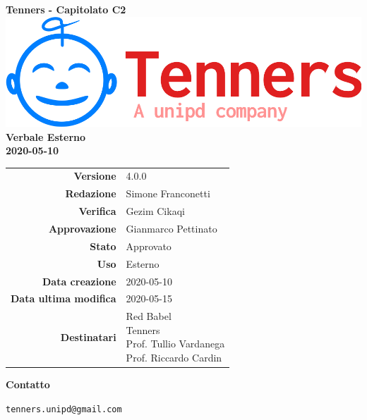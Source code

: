 \begin{titlepage}
	\begin{center}
		\large \textbf{Tenners - Capitolato C2}
		\vfill
		\includegraphics[scale = 0.3]{./res/img/logo.png}\\
		\vfill
		\Huge \textbf{Verbale Esterno} \\
		\textbf {2020-05-10}

        \vfill
        \large

        \begin{tabular}{r|l}
        	\textbf{Versione} & 4.0.0 \\
        	\textbf{Redazione} & Simone Franconetti \\
        	\textbf{Verifica} &  Gezim Cikaqi \\
        	\textbf{Approvazione} & Gianmarco Pettinato \\
        	\textbf{Stato} & Approvato \\
        	\textbf{Uso} &  Esterno\\
        	\textbf{Data creazione} &  2020-05-10\\
        	\textbf{Data ultima modifica} & 2020-05-15 \\
        	\textbf{Destinatari} & \parbox[t]{5cm}{Red Babel\\Tenners \\ Prof. Tullio Vardanega\\ Prof. Riccardo Cardin}
        \end{tabular}
    	\vfill
    	\normalsize
    	\vfill
    	\textbf{Contatto}

    	\texttt{tenners.unipd@gmail.com}

	\end{center}
\end{titlepage}
